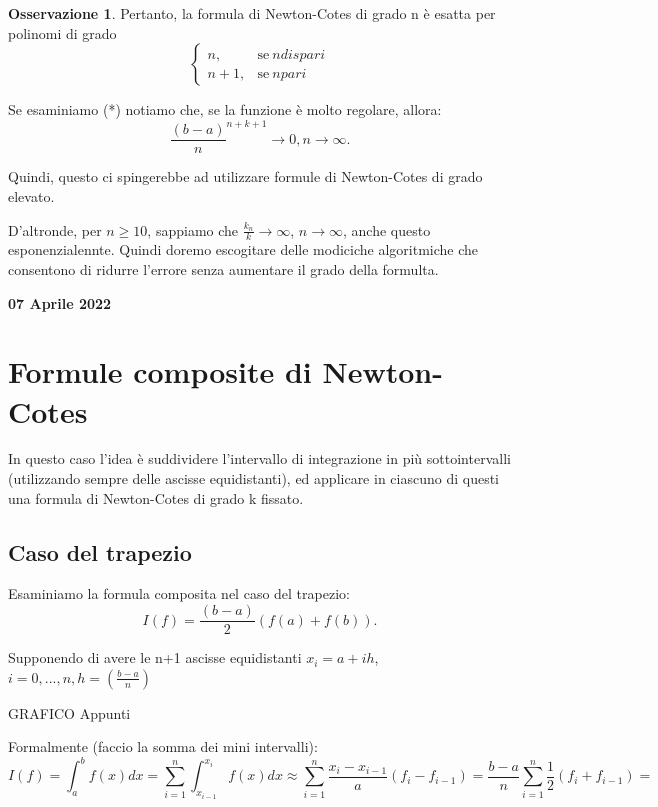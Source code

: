 \documentclass[11pt]{article}
\theoremstyle{definition}
\newtheorem{oss}{Osservazione}
\theoremstyle{plain}
\begin{document}
\begin{oss}
	Pertanto, la formula di Newton-Cotes di grado n è esatta per polinomi di grado 
	  \begin{equation}
	    \begin{cases}
	      n, & \text{se}\ n dispari \\
	      n+1, & \text{se}\ n pari
	    \end{cases}
	  \end{equation}
	
\end{oss}

Se esaminiamo (*) notiamo che, se la funzione è molto regolare, allora: 
\[
	\frac{(b-a)}{n}^{n+k+1}\to 0,n\to \infty
.\] 

Quindi, questo ci spingerebbe ad utilizzare formule di Newton-Cotes di grado elevato.

D'altronde, per $n\ge 10$, sappiamo che $\frac{k_n}{k}\to \infty$, $n\to \infty$, anche questo esponenzialennte. Quindi doremo escogitare delle modiciche algoritmiche che consentono di ridurre l'errore senza aumentare il grado della formulta.

\begin{center}
{\LARGE \bf 07 Aprile 2022}\\
\end{center}

\section{Formule composite di Newton-Cotes}

In questo caso l'idea è suddividere l'intervallo di integrazione in più sottointervalli (utilizzando sempre delle ascisse equidistanti), ed applicare in ciascuno di questi una formula di Newton-Cotes di grado k fissato.

\subsection{Caso del trapezio}

Esaminiamo la formula composita nel caso del trapezio:
\[
	I(f)=\frac{(b-a)}{2}(f(a)+f(b))
.\] 

Supponendo di avere le n+1 ascisse equidistanti $x_{i}=a+ih$, $i=0,...,n,h=(\frac{b-a}{n})$ 

GRAFICO Appunti

Formalmente (faccio la somma dei mini intervalli):
\[
	I(f)=\int_{a}^{b}f(x)dx=\sum_{i=1}^{n} \int_{x_{i-1}}^{x_{i}}f(x)dx\approx \sum_{i=1}^{n} \frac{x_{i}-x_{i-1}}{a}(f_i-f_{i-1})=\frac{b-a}{n}\sum_{i=1}^{n} \frac{1}{2}(f_{i}+f_{i-1})=
\] 
\end{document}
